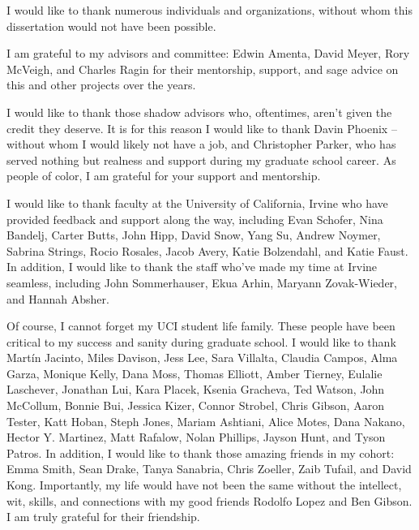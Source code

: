 \acknowledgments
{
  I would like to thank numerous individuals and organizations, without whom this dissertation would not have been possible. 
  
  I am grateful to my advisors and committee: Edwin Amenta, David Meyer, Rory McVeigh, and Charles Ragin for their mentorship, support, and sage advice on this and other projects over the years. 
  
   I would like to thank those shadow advisors who, oftentimes, aren't given the credit they deserve. It is for this reason I would like to thank Davin Phoenix -- without whom I would likely not have a job, and Christopher Parker, who has served nothing but realness and support during my graduate school career. As people of color, I am grateful for your support and mentorship. 
  
  
  
  I would like to thank faculty at the University of California, Irvine who have provided feedback and support along the way, including Evan Schofer, Nina Bandelj, Carter Butts, John Hipp, David Snow, Yang Su, Andrew Noymer, Sabrina Strings, Rocio Rosales, Jacob Avery, Katie Bolzendahl, and Katie Faust. In addition, I would like to thank the staff who've made my time at Irvine seamless, including John Sommerhauser, Ekua Arhin, Maryann Zovak-Wieder, and Hannah Absher.
  
  Of course, I cannot forget my UCI student life family. These people have been critical to my success and sanity during graduate school. I would like to thank Mart\'{i}n Jacinto, Miles Davison, Jess Lee, Sara Villalta, Claudia Campos, Alma Garza, Monique Kelly, Dana Moss, Thomas Elliott, Amber Tierney, Eulalie Laschever, Jonathan Lui, Kara Placek, Ksenia Gracheva, Ted Watson, John McCollum, Bonnie Bui, Jessica Kizer, Connor Strobel, Chris Gibson, Aaron Tester, Katt Hoban, Steph Jones, Mariam Ashtiani, Alice Motes, Dana Nakano, Hector Y. Martinez, Matt Rafalow, Nolan Phillips, Jayson Hunt, and Tyson Patros. In addition, I would like to thank those amazing friends in my cohort: Emma Smith, Sean Drake, Tanya Sanabria, Chris Zoeller, Zaib Tufail, and David Kong. Importantly, my life would have not been the same without the intellect, wit, skills, and connections with my good friends Rodolfo Lopez and Ben Gibson. I am truly grateful for their friendship. 
  
}
